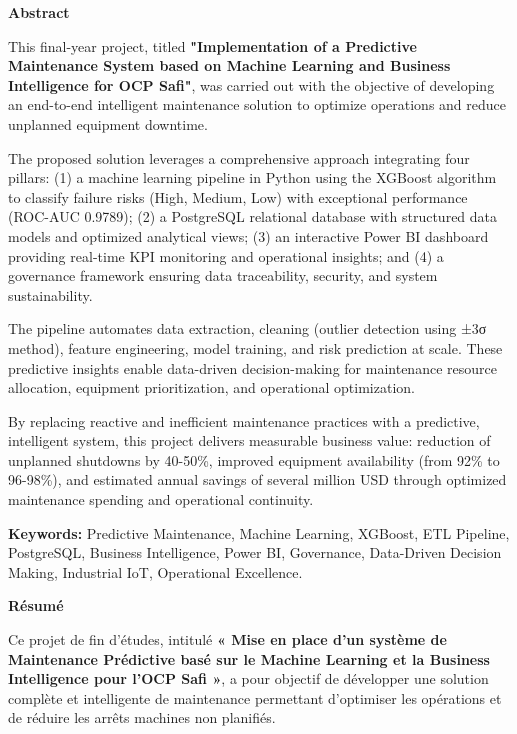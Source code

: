 \documentclass[a4paper,12pt,twoside]{report}
\begin{document}
\newpage
\thispagestyle{empty}
\begin{center}
\Large\textbf{Abstract}
\end{center}

\vspace{2cm}

This final-year project, titled \textbf{"Implementation of a Predictive Maintenance System based on Machine Learning and Business Intelligence for OCP Safi"}, was carried out with the objective of developing an end-to-end intelligent maintenance solution to optimize operations and reduce unplanned equipment downtime.

The proposed solution leverages a comprehensive approach integrating four pillars: (1) a machine learning pipeline in Python using the XGBoost algorithm to classify failure risks (High, Medium, Low) with exceptional performance (ROC-AUC 0.9789); (2) a PostgreSQL relational database with structured data models and optimized analytical views; (3) an interactive Power BI dashboard providing real-time KPI monitoring and operational insights; and (4) a governance framework ensuring data traceability, security, and system sustainability.

The pipeline automates data extraction, cleaning (outlier detection using ±3σ method), feature engineering, model training, and risk prediction at scale. These predictive insights enable data-driven decision-making for maintenance resource allocation, equipment prioritization, and operational optimization.

By replacing reactive and inefficient maintenance practices with a predictive, intelligent system, this project delivers measurable business value: reduction of unplanned shutdowns by 40-50\%, improved equipment availability (from 92\% to 96-98\%), and estimated annual savings of several million USD through optimized maintenance spending and operational continuity.

\textbf{Keywords:} Predictive Maintenance, Machine Learning, XGBoost, ETL Pipeline, PostgreSQL, Business Intelligence, Power BI, Governance, Data-Driven Decision Making, Industrial IoT, Operational Excellence.

\newpage
\thispagestyle{empty}
\begin{center}
\Large\textbf{Résumé}
\end{center}

\vspace{2cm}

Ce projet de fin d'études, intitulé \textbf{« Mise en place d'un système de Maintenance Prédictive basé sur le Machine Learning et la Business Intelligence pour l'OCP Safi »}, a pour objectif de développer une solution complète et intelligente de maintenance permettant d'optimiser les opérations et de réduire les arrêts machines non planifiés.
\end{document}
